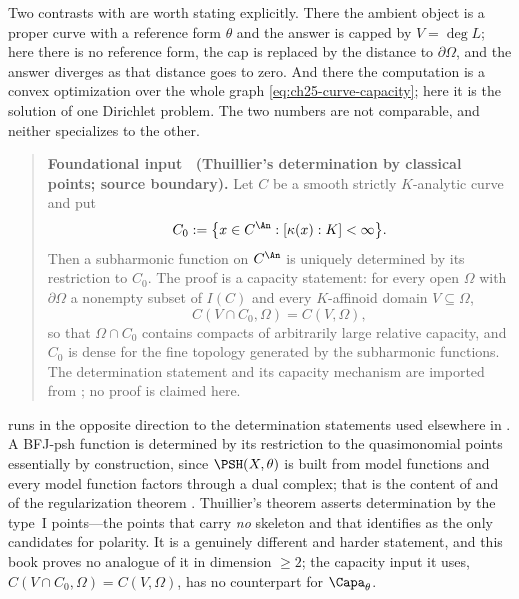\begin{example}
Two contrasts with  are worth stating
explicitly.  There the ambient object is a proper curve with a reference
form $\theta$ and the answer is capped by $V=\deg L$; here there is no
reference form, the cap is replaced by the distance to $\partial\Omega$,
and the answer diverges as that distance goes to zero.  And there the
computation is a convex optimization over the whole graph
\eqref{eq:ch25-curve-capacity}; here it is the solution of one Dirichlet
problem.  The two numbers are not comparable, and neither specializes to the
other.
\end{example}

\label{thm:ch25-thuillier-classical-points}
\begin{quote}
\textbf{Foundational input \thetheorem\ (Thuillier's determination by
classical points; source boundary).}
Let $C$ be a smooth strictly $K$-analytic curve and put
\[
 C_0:=\bigl\{x\in C^{\An}:[\kappa(x):K]<\infty\bigr\}.
\]
Then a subharmonic function on $C^{\An}$ is uniquely determined by its
restriction to $C_0$.  The proof is a capacity statement: for every open
$\Omega$ with $\partial\Omega$ a nonempty subset of $I(C)$ and every
$K$-affinoid domain $V\subseteq\Omega$,
\[
 C(V\cap C_0,\Omega)=C(V,\Omega),
\]
so that $\Omega\cap C_0$ contains compacts of arbitrarily large relative
capacity, and $C_0$ is dense for the fine topology generated by the
subharmonic functions.
The determination statement and its capacity mechanism are imported from
\cite[Th\'eor\`eme~3.6.26 and Proposition~3.6.29]{Thu05}; no proof is
claimed here.
\end{quote}

\begin{remark}
\label{rem:ch25-thuillier-determination}
 runs in the opposite direction to
the determination statements used elsewhere in .  A
BFJ-psh function is determined by its restriction to the quasimonomial
points essentially by construction, since $\PSH(X,\theta)$ is built from
model functions and every model function factors through a dual complex; that
is the content of  and of the
regularization theorem .  Thuillier's
theorem asserts determination by the type~$\mathrm{I}$ points---the points
that carry \emph{no} skeleton and that
 identifies as the only candidates for
polarity.  It is a genuinely different and harder statement, and this book
proves no analogue of it in dimension $\geq2$; the capacity input it uses,
$C(V\cap C_0,\Omega)=C(V,\Omega)$, has no counterpart for
$\Capa_\theta$.
\end{remark}


